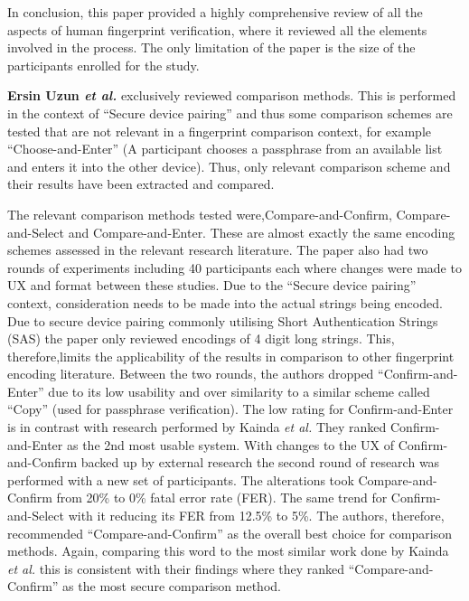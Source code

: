 In conclusion, this paper provided a highly comprehensive review of all the aspects of human fingerprint verification, where it reviewed all the elements involved in the process. The only limitation of the paper is the size of the participants enrolled for the study.

\textbf{Ersin Uzun \textit{et al.}}\cite{uzun2007usability} exclusively reviewed comparison methods. This is performed in the context of ``Secure device pairing'' and thus some comparison schemes are tested that are not relevant in a fingerprint comparison context, for example  ``Choose-and-Enter'' (A participant chooses a passphrase from an available list and enters it into the other device). Thus, only relevant comparison scheme and their results have been extracted and compared. 

The relevant comparison methods tested were,Compare-and-Confirm, Compare-and-Select and Compare-and-Enter. These are almost exactly the same encoding schemes assessed in the relevant research literature. The paper also had two rounds of experiments including 40 participants each where changes were made to UX and format between these studies. 
Due to the ``Secure device pairing'' context, consideration needs to be made into the actual strings being encoded. Due to secure device pairing commonly utilising Short Authentication Strings (SAS) the
paper only reviewed encodings of 4 digit long strings. This, therefore,limits the applicability of the results in comparison to other fingerprint encoding literature. Between the two rounds, the authors dropped ``Confirm-and-Enter'' due to its low usability and over similarity to a similar scheme called ``Copy'' (used for passphrase verification). The low rating for Confirm-and-Enter is in contrast with research performed by Kainda \textit{et al.}\cite{kainda2009usability} They ranked Confirm-and-Enter as the 2nd most usable system. With changes to the UX of Confirm-and-Confirm backed up by external research \cite{palmer1990attentional}\cite{hammer2009category} the second round of research was performed with a new set of participants. The alterations took Compare-and-Confirm from 20\% to 0\% fatal error rate (FER). The same trend for Confirm-and-Select with it reducing its FER from 12.5\% to 5\%. The authors, therefore, recommended ``Compare-and-Confirm'' as the overall best choice for comparison methods. Again, comparing this word to the most similar work done by Kainda \textit{et al.}\cite{kainda2009usability} this is consistent with their findings where they ranked ``Compare-and-Confirm'' as the most secure comparison method.

